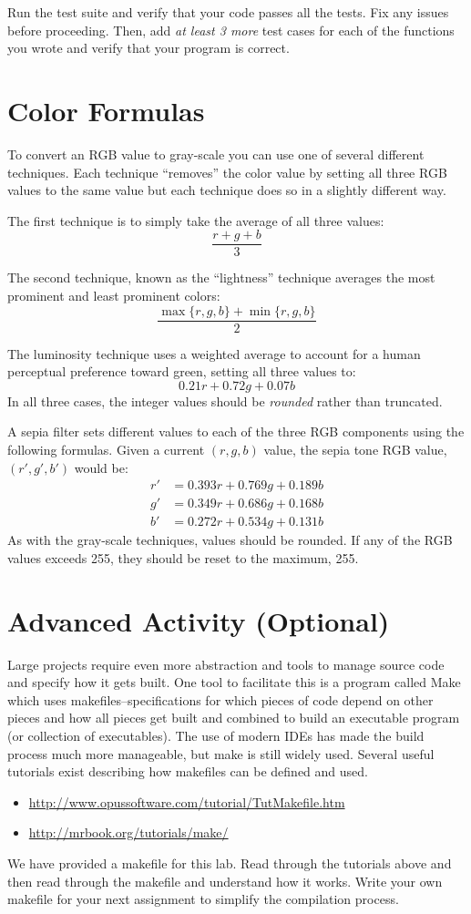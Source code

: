 \documentclass[12pt]{scrartcl}
\begin{document}
Run the test suite and verify that your code passes all the tests.
Fix any issues before proceeding.  Then, add \emph{at least 3 more} 
test cases for each of the functions you wrote and verify that your 
program is correct.

\section*{Color Formulas}

To convert an RGB value to gray-scale you can use one of several
different techniques.  Each technique ``removes'' the color value by
setting all three RGB values to the same value but each technique 
does so in a slightly different way.

The first technique is to simply take the average of all three values:
  $$\frac{r + g + b}{3}$$

The second technique, known as the ``lightness'' technique averages 
the most prominent and least prominent colors:
  $$\frac{\max\{r, g, b\} + \min\{r, g, b\}}{2}$$

The luminosity technique uses a weighted average to account for a human 
perceptual preference toward green, setting all three values to:
  $$0.21 r + 0.72 g + 0.07 b$$
In all three cases, the integer values should be \emph{rounded} rather 
than truncated.

A sepia filter sets different values to each of the three RGB components 
using the following formulas.  Given a current $(r,g,b)$ value, the sepia
tone RGB value, $(r',g',b')$ would be:
$$\begin{array}{ll}
  r' &= 0.393r + 0.769g + 0.189b \\
  g' &= 0.349r + 0.686g + 0.168b \\
  b' &= 0.272r + 0.534g + 0.131b
\end{array}$$
As with the gray-scale techniques, values should be rounded.  If any of
the RGB values exceeds 255, they should be reset to the maximum, 255.

\section{Advanced Activity (Optional)}

Large projects require even more abstraction and tools to manage 
source code and specify how it gets built.  One tool to facilitate this 
is a program called Make which uses makefiles--specifications for 
which pieces of code depend on other pieces and how all pieces 
get built and combined to build an executable program (or collection 
of executables).  The use of modern IDEs has made the build process 
much more manageable, but make is still widely used.  Several 
useful tutorials exist describing how makefiles can be defined and 
used.
\begin{itemize}
  \item \url{http://www.opussoftware.com/tutorial/TutMakefile.htm}
  \item \url{http://mrbook.org/tutorials/make/}
\end{itemize}
We have provided a makefile for this lab.  Read through the tutorials
above and then read through the makefile and understand how it works.
Write your own makefile for your next assignment to simplify the
compilation process.
\end{document}
